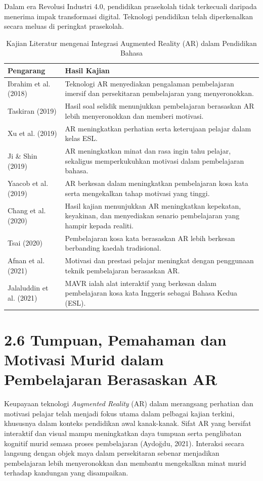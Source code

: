 Dalam era Revolusi Industri 4.0, pendidikan prasekolah tidak terkecuali daripada menerima impak transformasi digital. Teknologi pendidikan telah diperkenalkan secara meluas di peringkat prasekolah.

\begin{table}[htbp]
    \centering
    \caption{Kajian Literatur mengenai Integrasi Augmented Reality (AR) dalam Pendidikan Bahasa}
    \begin{tabular}{p{4cm} p{10cm}}
        \toprule
        \textbf{Pengarang} & \textbf{Hasil Kajian} \\
        \midrule
        Ibrahim et al. (2018) & Teknologi AR menyediakan pengalaman pembelajaran imersif dan persekitaran pembelajaran yang menyeronokkan. \\
        Taskiran (2019) & Hasil soal selidik menunjukkan pembelajaran berasaskan AR lebih menyeronokkan dan memberi motivasi. \\
        Xu et al. (2019) & AR meningkatkan perhatian serta keterujaan pelajar dalam kelas ESL. \\
        Ji \& Shin (2019) & AR meningkatkan minat dan rasa ingin tahu pelajar, sekaligus memperkukuhkan motivasi dalam pembelajaran bahasa. \\
        Yaacob et al. (2019) & AR berkesan dalam meningkatkan pembelajaran kosa kata serta mengekalkan tahap motivasi yang tinggi. \\
        Chang et al. (2020) & Hasil kajian menunjukkan AR meningkatkan kepekatan, keyakinan, dan menyediakan senario pembelajaran yang hampir kepada realiti. \\
        Tsai (2020) & Pembelajaran kosa kata berasaskan AR lebih berkesan berbanding kaedah tradisional. \\
        Afnan et al. (2021) & Motivasi dan prestasi pelajar meningkat dengan penggunaan teknik pembelajaran berasaskan AR. \\
        Jalaluddin et al. (2021) & MAVR ialah alat interaktif yang berkesan dalam pembelajaran kosa kata Inggeris sebagai Bahasa Kedua (ESL). \\
        \bottomrule
  \end{tabular}
  \end{table}
\section*{2.6 Tumpuan, Pemahaman dan Motivasi Murid dalam Pembelajaran Berasaskan AR}

Keupayaan teknologi \textit{Augmented Reality} (AR) dalam merangsang perhatian dan motivasi pelajar telah menjadi fokus utama dalam pelbagai kajian terkini, khususnya dalam konteks pendidikan awal kanak-kanak. Sifat AR yang bersifat interaktif dan visual mampu meningkatkan daya tumpuan serta penglibatan kognitif murid semasa proses pembelajaran (Aydoğdu, 2021). Interaksi secara langsung dengan objek maya dalam persekitaran sebenar menjadikan pembelajaran lebih menyeronokkan dan membantu mengekalkan minat murid terhadap kandungan yang disampaikan.


